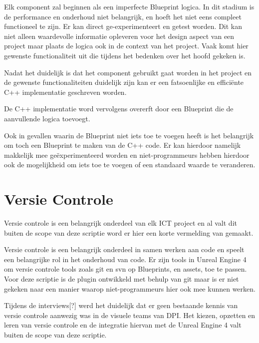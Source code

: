 Elk component zal beginnen als een imperfecte Blueprint logica. In dit stadium is de performance en onderhoud niet belangrijk, en hoeft het niet eens compleet functioneel te zijn. Er kan direct ge-experimenteert en getest worden. Dit kan niet alleen waardevolle informatie opleveren voor het design aspect van een project maar plaats de logica ook in de context van het project. Vaak komt hier gewenste functionaliteit uit die tijdens het bedenken over het hoofd gekeken is.

Nadat het duidelijk is dat het component gebruikt gaat worden in het project en de gewenste functionaliteiten duidelijk zijn kan er een fatsoenlijke en efficiënte C++ implementatie geschreven worden.

De C++ implementatie word vervolgens overerft door een Blueprint die de aanvullende logica toevoegt.

Ook in gevallen waarin de Blueprint niet iets toe te voegen heeft is het belangrijk om toch een Blueprint te maken van de C++ code. Er kan hierdoor namelijk makkelijk mee geëxperimenteerd worden en niet-programmeurs hebben hierdoor ook de mogelijkheid om iets toe te voegen of een standaard waarde te veranderen.

\section{Versie Controle}
Versie controle is een belangrijk onderdeel van elk ICT project en al valt dit buiten de scope van deze scriptie word er hier een korte vermelding van gemaakt.

Versie controle is een belangrijk onderdeel in samen werken aan code en speelt een belangrijke rol in het onderhoud van code. Er zijn tools in Unreal Engine 4 om versie controle tools zoals git en svn op Blueprints, en assets, toe te passen. Voor deze scriptie is de plugin ontwikkeld met behulp van git maar is er niet gekeken naar een manier waarop niet-programmeurs hier ook mee kunnen werken.

Tijdens de interviews[?] werd het duidelijk dat er geen bestaande kennis van versie controle aanwezig was in de visuele teams van DPI. Het kiezen, opzetten en leren van versie controle en de integratie hiervan met de Unreal Engine 4 valt buiten de scope van deze scriptie.